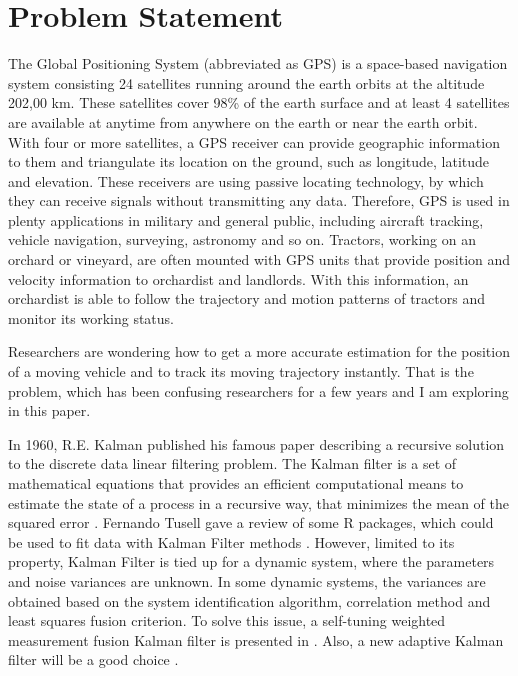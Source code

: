 
\section{Problem Statement}


%
%
%





The Global Positioning System (abbreviated as GPS) is a space-based navigation system consisting 24 satellites running around the earth orbits at the altitude 202,00 km. These satellites cover 98\% of the earth surface and at least 4 satellites are available at anytime from anywhere on the earth or near the earth orbit. With four or more satellites, a GPS receiver can provide geographic information to them and triangulate its location on the ground, such as longitude, latitude and elevation. These receivers are using passive locating technology, by which they can receive signals without transmitting any data. Therefore, GPS is used in plenty applications in military and general public, including aircraft tracking, vehicle navigation, surveying, astronomy and so on. Tractors, working on an orchard or vineyard, are often mounted with GPS units that provide position and velocity information to orchardist and landlords. With this information, an orchardist is able to follow the trajectory and motion patterns of tractors and monitor its working status. 

Researchers are wondering how to get a more accurate estimation for the position of a moving vehicle and to track its moving trajectory instantly.  That is the problem, which has been confusing researchers for a few years and I am exploring in this paper. 

In 1960, R.E. Kalman published his famous paper describing a recursive solution to the discrete data linear filtering problem. The Kalman filter is a set of mathematical equations that provides an efficient computational means to estimate the state of a process in a recursive way, that minimizes the mean of the squared error \cite{introkalman}. Fernando Tusell gave a review of some R packages, which could be used to fit data with Kalman Filter methods \cite{kalmaninr}. However, limited to its property, Kalman Filter is tied up for a dynamic system, where the parameters and noise variances are unknown. In some dynamic systems, the variances are obtained based on the system identification algorithm, correlation method and least squares fusion criterion. To solve this issue, a self-tuning weighted measurement fusion Kalman filter is presented in \cite{selfturningkalman}. Also, a new adaptive Kalman filter will be a good choice \cite{adaptivekalman}. 






